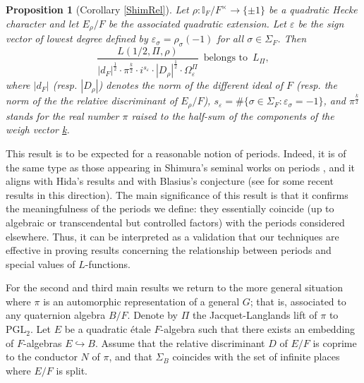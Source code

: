 \documentclass{amsart}
\newtheorem{proposition}[theorem]{Proposition}
\theoremstyle{definition}
\theoremstyle{remark}
\numberwithin{equation}{section}
\newcommand{\PGL}{{\mathrm{PGL}}}
\newcommand{\I}{{\mathbb I}}
\begin{document}
\begin{proposition}[Corollary \ref{ShimRel}]\label{prop1}
    Let $\rho:\I_F/F^\times\rightarrow \{\pm 1\}$ be a quadratic Hecke character and let $E_\rho/F$ be the associated quadratic extension. Let $\varepsilon$ be the sign vector of lowest degree defined by $\varepsilon_\sigma=\rho_{\sigma}(-1)$ for all $\sigma\in\Sigma_F$. Then 
    \[
    \frac{L(1/2,\Pi, \rho)}{|d_F|^{\frac{1}{2}}\cdot\pi^{\frac{\underline k}{2}}\cdot i^{s_\varepsilon}\cdot |D_{\rho}|^{\frac{1}{2}}\cdot \Omega_\varepsilon^\Pi}\,\text{ belongs to }\, L_{\Pi},
    \]
    where $|d_F|$ (resp. $|D_\rho|$) denotes the norm of the different ideal of $F$ (resp. the norm of the the relative discriminant of $E_\rho/F$), $s_\varepsilon=\#\{\sigma\in\Sigma_F\colon \varepsilon_\sigma=-1\}$, and $\pi^{\frac{\underline{k}}{2}}$  stands for the real number $\pi$ raised to the half-sum of the components of the weigh vector \underline{k}.
\end{proposition}

This result is to be expected for a reasonable notion of periods. Indeed, it is of the same type as those appearing in Shimura's seminal works on periods \cite{Shimura76, Shimura78},  and it aligns with Hida's results \cite{hida-duke} and with Blasius's conjecture \cite{blasius} (see \cite{JST} for some recent results in this direction). The main significance of this result is that it confirms the meaningfulness of the periods we define: they essentially coincide (up to algebraic or transcendental but controlled factors) with the periods considered elsewhere. Thus, it can be interpreted as a validation that our techniques are effective in proving results concerning the relationship between periods and special values of $L$-functions.

For the second and third main results we return to the more general situation where $\pi$ is an automorphic representation of a general  $G$; that is, associated to any quaternion algebra $B/F$. Denote by $\Pi$ the Jacquet-Langlands lift of $\pi$ to $\PGL_2$. Let $E$ be a quadratic étale $F$-algebra such that there exists an embedding of $F$-algebras $E\hookrightarrow B$. Assume that the relative discriminant $D$ of $E/F$ is coprime to the conductor $N$ of $\pi$, and that $\Sigma_B$ coincides with the set of infinite places where $E/F$ is split.
\end{document}
